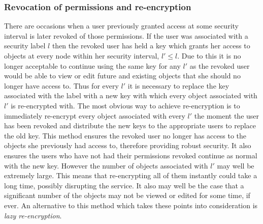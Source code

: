 \documentclass[12pt, titlepage]{article}
\begin{document}
\subsubsection{Revocation of permissions and re-encryption}
There are occasions when a user previously granted access at some security interval is later revoked of those permissions. If the user was associated with a security label $l$ then the revoked user has held a key which grants her access to objects at every node within her security interval, $l' \le l$. Due to this it is no longer acceptable to continue using the same key for any $l'$ as the revoked user would be able to view or edit future and existing objects that she should no longer have access to. Thus for every $l'$ it is necessary to replace the key associated with the label with a new key with which every object associated with $l'$ is re-encrypted with.
\newline \indent The most obvious way to achieve re-encryption is to immediately re-encrypt every object associated with every $l'$ the moment the user has been revoked and distribute the new keys to the appropriate users to replace the old key. This method ensures the revoked user no longer has access to the objects she previously had access to, therefore providing robust security. It also ensures the users who have not had their permissions revoked continue as normal with the new key. However the number of objects associated with $l'$ may well be extremely large. This means that re-encrypting all of them instantly could take a long time, possibly disrupting the service. It also may well be the case that a significant number of the objects may not be viewed or edited for some time, if ever. An alternative to this method which takes these points into consideration is \textit{lazy re-encryption}.
\end{document}
